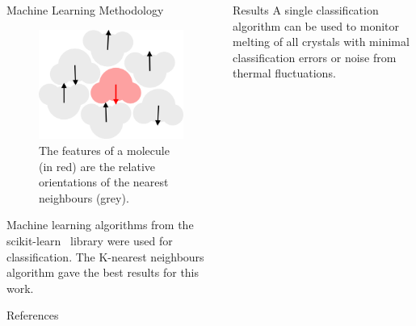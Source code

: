 \documentclass{beamer}
\begin{document}
\begin{frame}[t]{}
\begin{columns}[t]
\begin{column}{0.47\linewidth}
\begin{block}{Machine Learning Methodology}
      \begin{figure}[h]
        \centering
        \includegraphics[width=0.6\linewidth]{orientations}
        \caption{The features of a molecule (in red) are the relative orientations of the nearest
        neighbours (grey).}
        \label{fig:orientations}
      \end{figure}

      Machine learning algorithms from the scikit-learn~\autocite{scikit-learn} library
      were used for classification.
      The K-nearest neighbours algorithm gave the best results for this work.

    \end{block}

    \begin{block}{References}
      \printbibliography
    \end{block}

    \end{column}
    \begin{column}{0.47\linewidth}
      \begin{block}{Results}
        A single classification algorithm can be used to monitor melting of all crystals
        with minimal classification errors or noise from thermal fluctuations.


\end{block}
\end{column}
\end{columns}
\end{frame}
\end{document}
